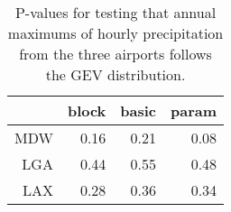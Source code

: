 \begin{table}[ht]
\centering
\caption{P-values for testing that annual maximums of hourly 
            precipitation from the three airports follows the GEV distribution.} 
\label{table:precipitation}
\begin{tabular}{rrrr}
  \hline
 & block & basic & param \\ 
  \hline
MDW & 0.16 & 0.21 & 0.08 \\ 
  LGA & 0.44 & 0.55 & 0.48 \\ 
  LAX & 0.28 & 0.36 & 0.34 \\ 
   \hline
\end{tabular}
\end{table}

